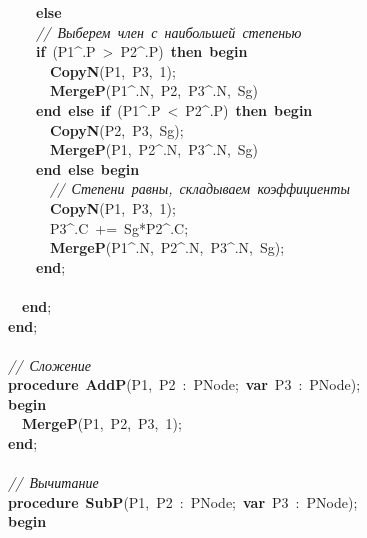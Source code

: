 \mbox{}\ \ \ \ \textbf{else} \\
\mbox{}\ \ \ \ \textit{//\ Выберем\ член\ с\ наибольшей\ степенью} \\
\mbox{}\ \ \ \ \textbf{if}\ (P1\textasciicircum{}.P\ \textgreater{}\ P2\textasciicircum{}.P)\ \textbf{then}\ \textbf{begin} \\
\mbox{}\ \ \ \ \ \ \textbf{CopyN}(P1,\ P3,\ 1); \\
\mbox{}\ \ \ \ \ \ \textbf{MergeP}(P1\textasciicircum{}.N,\ P2,\ P3\textasciicircum{}.N,\ Sg) \\
\mbox{}\ \ \ \ \textbf{end}\ \textbf{else}\ \textbf{if}\ (P1\textasciicircum{}.P\ \textless{}\ P2\textasciicircum{}.P)\ \textbf{then}\ \textbf{begin} \\
\mbox{}\ \ \ \ \ \ \textbf{CopyN}(P2,\ P3,\ Sg); \\
\mbox{}\ \ \ \ \ \ \textbf{MergeP}(P1,\ P2\textasciicircum{}.N,\ P3\textasciicircum{}.N,\ Sg) \\
\mbox{}\ \ \ \ \textbf{end}\ \textbf{else}\ \textbf{begin} \\
\mbox{}\ \ \ \ \ \ \textit{//\ Степени\ равны,\ складываем\ коэффициенты} \\
\mbox{}\ \ \ \ \ \ \textbf{CopyN}(P1,\ P3,\ 1); \\
\mbox{}\ \ \ \ \ \ P3\textasciicircum{}.C\ +=\ Sg*P2\textasciicircum{}.C; \\
\mbox{}\ \ \ \ \ \ \textbf{MergeP}(P1\textasciicircum{}.N,\ P2\textasciicircum{}.N,\ P3\textasciicircum{}.N,\ Sg); \\
\mbox{}\ \ \ \ \textbf{end}; \\
\mbox{}\ \  \\
\mbox{}\ \ \textbf{end}; \\
\mbox{}\textbf{end}; \\
\mbox{} \\
\mbox{}\textit{//\ Сложение} \\
\mbox{}\textbf{procedure}\ \textbf{AddP}(P1,\ P2\ :\ PNode;\ \textbf{var}\ P3\ :\ PNode); \\
\mbox{}\textbf{begin} \\
\mbox{}\ \ \textbf{MergeP}(P1,\ P2,\ P3,\ 1); \\
\mbox{}\textbf{end}; \\
\mbox{} \\
\mbox{}\textit{//\ Вычитание} \\
\mbox{}\textbf{procedure}\ \textbf{SubP}(P1,\ P2\ :\ PNode;\ \textbf{var}\ P3\ :\ PNode); \\
\mbox{}\textbf{begin} \\

